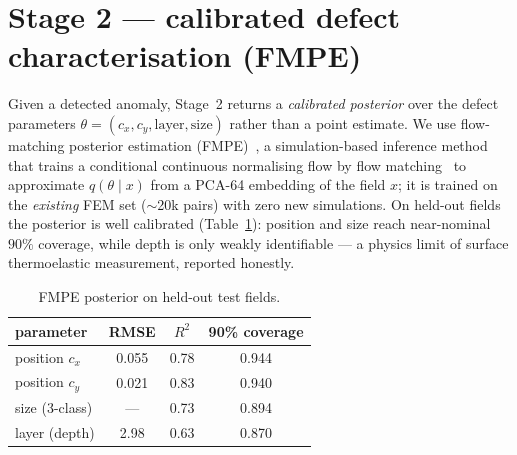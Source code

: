 \documentclass[11pt]{article}
\begin{document}
\section{Stage 2 --- calibrated defect characterisation (FMPE)}
Given a detected anomaly, Stage~2 returns a \emph{calibrated posterior} over the
defect parameters $\theta=(c_x,c_y,\text{layer},\text{size})$ rather than a point
estimate. We use flow-matching posterior estimation
(FMPE)~\cite{dax2023flow}, a simulation-based inference
method~\cite{cranmer2020frontier} that trains a conditional continuous normalising
flow by flow matching~\cite{lipman2023flow} to approximate $q(\theta\mid x)$ from a
PCA-64 embedding of the field $x$; it is trained on the \emph{existing} FEM set
($\sim$20k pairs) with zero new simulations. On held-out fields the posterior is
well calibrated (Table~\ref{tab:fmpe}): position and size reach near-nominal
$90\%$ coverage, while depth is only weakly identifiable --- a physics limit of
surface thermoelastic measurement, reported honestly.
\begin{table}[h]\centering\small
  \caption{FMPE posterior on held-out test fields.}
  \label{tab:fmpe}
  \begin{tabular}{lccc}
    \toprule
    parameter & RMSE & $R^2$ & 90\% coverage \\ \midrule
    position $c_x$  & 0.055 & 0.78 & 0.944 \\
    position $c_y$  & 0.021 & 0.83 & 0.940 \\
    size (3-class)  & ---   & 0.73 & 0.894 \\
    layer (depth)   & 2.98  & 0.63 & 0.870 \\
    \bottomrule
  \end{tabular}
\end{table}
\end{document}
